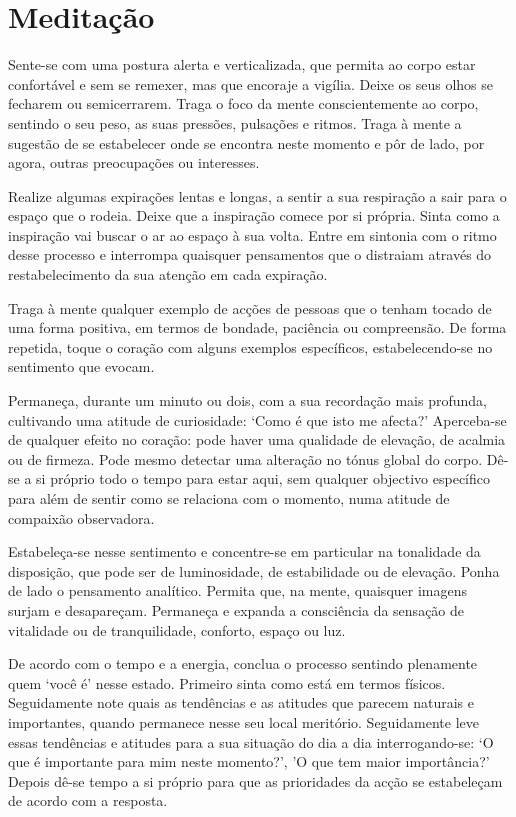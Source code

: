 
\chapter{Meditação}


Sente-se com uma postura alerta e verticalizada, que permita ao corpo estar
confortável e sem se remexer, mas que encoraje a vigília. Deixe os seus olhos se
fecharem ou semicerrarem. Traga o foco da mente conscientemente ao corpo,
sentindo o seu peso, as suas pressões, pulsações e ritmos. Traga à mente a
sugestão de se estabelecer onde se encontra neste momento e pôr de lado, por
agora, outras preocupações ou interesses.

Realize algumas expirações lentas e longas, a sentir a sua respiração a sair
para o espaço que o rodeia. Deixe que a inspiração comece por si própria. Sinta
como a inspiração vai buscar o ar ao espaço à sua volta. Entre em sintonia com o
ritmo desse processo e interrompa quaisquer pensamentos que o distraiam através
do restabelecimento da sua atenção em cada expiração.

Traga à mente qualquer exemplo de acções de pessoas que o tenham tocado de uma
forma positiva, em termos de bondade, paciência ou compreensão. De forma
repetida, toque o coração com alguns exemplos específicos, estabelecendo-se no
sentimento que evocam.

Permaneça, durante um minuto ou dois, com a sua recordação mais profunda,
cultivando uma atitude de curiosidade: `Como é que isto me afecta?' Aperceba-se
de qualquer efeito no coração: pode haver uma qualidade de elevação, de acalmia
ou de firmeza. Pode mesmo detectar uma alteração no tónus global do corpo. Dê-se
a si próprio todo o tempo para estar aqui, sem qualquer objectivo específico
para além de sentir como se relaciona com o momento, numa atitude de compaixão
observadora.

Estabeleça-se nesse sentimento e concentre-se em particular na tonalidade da
disposição, que pode ser de luminosidade, de estabilidade ou de elevação. Ponha
de lado o pensamento analítico. Permita que, na mente, quaisquer imagens surjam
e desapareçam. Permaneça e expanda a consciência da sensação de vitalidade ou de
tranquilidade, conforto, espaço ou luz.

De acordo com o tempo e a energia, conclua o processo sentindo plenamente quem
`você é' nesse estado. Primeiro sinta como está em termos físicos. Seguidamente
note quais as tendências e as atitudes que parecem naturais e importantes,
quando permanece nesse seu local meritório. Seguidamente leve essas tendências e
atitudes para a sua situação do dia a dia interrogando-se: `O que é importante
para mim neste momento?', 'O que tem maior importância?' Depois dê-se tempo a si
próprio para que as prioridades da acção se estabeleçam de acordo com a
resposta.
